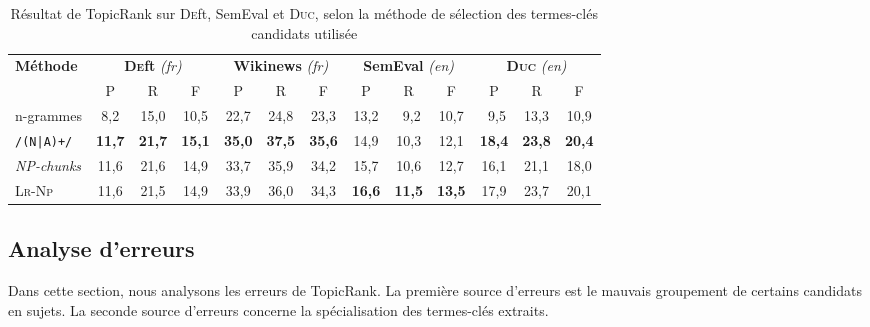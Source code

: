         \begin{table}
          \centering
          \begin{tabular}{l|c@{~~}c@{~~}c@{~}|c@{~~}c@{~~}c@{~}|c@{~~}c@{~~}c@{~}|c@{~~}c@{~~}c@{~}}
            \toprule
            \multirow{2}{*}[-2pt]{\textbf{Méthode}} & \multicolumn{3}{c|}{\textbf{\textsc{De}ft} \textit{(fr)}} & \multicolumn{3}{c|}{\textbf{Wikinews} \textit{(fr)}} & \multicolumn{3}{c|}{\textbf{SemEval} \textit{(en)}} & \multicolumn{3}{c}{\textbf{\textsc{Duc}} \textit{(en)}}\\
            \cline{2-4}\cline{5-7}\cline{8-10}\cline{11-13}
            & P & R & F & P & R & F & P & R & F & P & R & F\\
            \hline
            n-grammes & 8,2 & 15,0 & 10,5 & 22,7 & 24,8 & 23,3 & 13,2 & $~~$9,2 & 10,7 & $~~$9,5 & 13,3 & 10,9\\
            \texttt{/(N|A)+/} & \textbf{11,7} & \textbf{21,7} & \textbf{15,1} & \textbf{35,0} & \textbf{37,5} & \textbf{35,6} & 14,9 & 10,3 & 12,1 & \textbf{18,4} & \textbf{23,8} & \textbf{20,4}\\
            \textit{NP-chunks} & 11,6 & 21,6 & 14,9 & 33,7 & 35,9 & 34,2 & 15,7 & 10,6 & 12,7 & 16,1 & 21,1 & 18,0\\
            \textsc{Lr-Np} & 11,6 & 21,5 & 14,9 & 33,9 & 36,0 & 34,3 & \textbf{16,6} & \textbf{11,5} & \textbf{13,5} & 17,9 & 23,7 & 20,1\\
            \bottomrule
          \end{tabular}
          \caption{
            Résultat de TopicRank sur \textsc{De}ft, SemEval et \textsc{Duc},
            selon la méthode de sélection des termes-clés candidats utilisée
            \label{tab:topicrank_candidate_selection}
          }
        \end{table}

      \subsection{Analyse d'erreurs}
      \label{subsec:main:domain_independent_keyphrase_extraction-unsupervised_automatic_keyphrase_extraction-error_analysis}
        Dans cette section, nous analysons les erreurs de TopicRank. La première
        source d'erreurs est le mauvais groupement de certains candidats en
        sujets. La seconde source d'erreurs concerne la spécialisation des
        termes-clés extraits.

